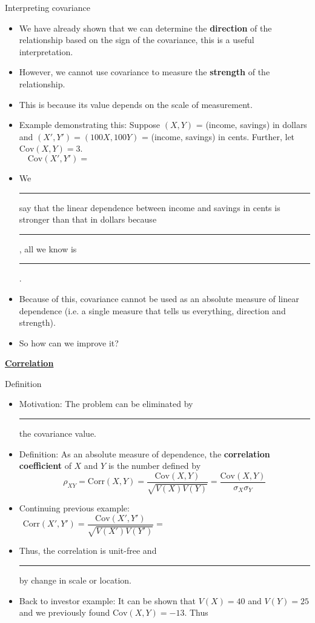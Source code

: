 \documentclass{article}
\newcommand{\bu}[1]{\textbf{\ul{#1}}}				%
\newcommand{\blankul}[1]{\rule[-1.5mm]{#1}{0.15mm}}	%
\newcommand{\cov}[1]{\mathrm{Cov}(#1)}		%
\newcommand{\corr}[1]{\mathrm{Corr}(#1)}		%
\begin{document}
\newpage%

Interpreting covariance\bigskip
\begin{itemize}
    \item We have already shown that we can determine the \textbf{direction} of the relationship based on the sign of the covariance, this is a useful interpretation.
    \item[] However, we cannot use covariance to measure the \textbf{strength} of the relationship.
    \item[] This is because its value depends on the scale of measurement.
    \item Example demonstrating this: Suppose $(X,Y)$ = (income, savings) in dollars and $(X',Y') = (100X,100Y)$ = (income, savings) in cents. Further, let $\cov{X,Y} = 3$.\bigskip
    \[\cov{X',Y'} = \hspace{300pt}\]
    \item[] We \blankul{1.5cm} say that the linear dependence between income and savings in cents is stronger than that in dollars because \blankul{6cm}, all we know is \blankul{2cm}.
    \item Because of this, covariance cannot be used as an absolute measure of linear dependence (i.e. a single measure that tells us everything, direction and strength).
    \item[] So how can we improve it?
\end{itemize}\bigskip

\bu{Correlation}\bigskip

Definition\bigskip
\begin{itemize}
    \item Motivation: The problem can be eliminated by \blankul{3cm} the covariance value.
    \item Definition: As an absolute measure of dependence, the \textbf{correlation coefficient} of $X$ and $Y$ is the number defined by
    \[\rho_{XY} = \corr{X,Y} = \frac{\cov{X,Y}}{\sqrt{V(X) V(Y)}} = \frac{\cov{X,Y}}{\sigma_X \sigma_Y}\]
    \item Continuing previous example:\bigskip
    \[\corr{X',Y'} = \frac{\cov{X',Y'}}{\sqrt{V(X') V(Y')}} = \hspace{200pt}\]
    \item[] Thus, the correlation is unit-free and \blankul{2.5cm} by change in scale or location.
    \item Back to investor example: It can be shown that $V(X) = 40$ and $V(Y) = 25$ and we previously found $\cov{X,Y} = -13$. Thus\vspace{40pt}
\end{itemize}\bigskip
\end{document}
